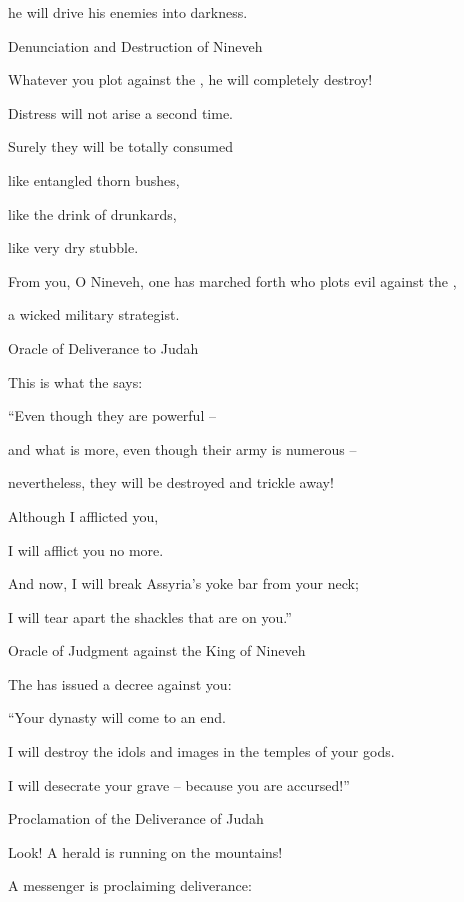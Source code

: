 {\par }{\Q he will drive
his enemies
into darkness.
\par }{\SH Denunciation and Destruction of Nineveh
\par }{\Q {}Whatever
you plot
against the
{}, he will completely
destroy!

\par }{\Q Distress
will not
arise
a second time.
\par }{\Q {}Surely
they will be totally
consumed
\par }{\Q like entangled
thorn
bushes,

\par }{\Q like the drink
of drunkards,
\par }{\Q like very dry
stubble.
\par }{\Q {}From
you, O Nineveh, one has marched forth
who plots
evil against
the {},
\par }{\Q a wicked
military strategist.
\par }{\SH Oracle of Deliverance to Judah
\par }{\Q {}This is what
the {}
says:

\par }{\Q “Even though
they are powerful –
\par }{\Q and what is
more,
even though their army
is numerous –
\par }{\Q nevertheless, they will be destroyed and trickle away!
\par }{\Q Although I afflicted you,
\par }{\Q I will afflict you no more.
\par }{\Q {}And now,
I will break
Assyria’s
yoke bar from your neck;

\par }{\Q I will tear apart
the shackles
that are on you.”
\par }{\SH Oracle of Judgment against the King of Nineveh
\par }{\Q {}The
{}
has issued a decree
against
you:

\par }{\Q “Your dynasty
will come to an end.
\par }{\Q I will destroy
the idols
and images
in the temples
of your gods.
\par }{\Q I will desecrate
your grave
– because
you are accursed!”
\par }{\SH Proclamation of the Deliverance of Judah
\par }{\Q {} Look! A herald is running on
the mountains!
\par }{\Q A messenger is proclaiming
deliverance:

}

